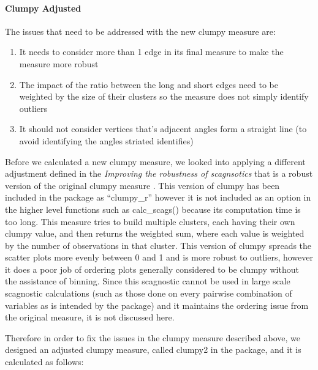 \hypertarget{clumpy-adjusted}{%
\paragraph{Clumpy Adjusted}\label{clumpy-adjusted}}

The issues that need to be addressed with the new clumpy measure are:

\begin{enumerate}
\def\labelenumi{\arabic{enumi}.}
\item
  It needs to consider more than 1 edge in its final measure to make the
  measure more robust
\item
  The impact of the ratio between the long and short edges need to be
  weighted by the size of their clusters so the measure does not simply
  identify outliers
\item
  It should not consider vertices that's adjacent angles form a straight
  line (to avoid identifying the angles striated identifies)
\end{enumerate}

Before we calculated a new clumpy measure, we looked into applying a
different adjustment defined in the \emph{Improving the robustness of
scagnsotics} that is a robust version of the original clumpy measure
\citep{robust}. This version of clumpy has been included in the package
as ``clumpy\_r'' however it is not included as an option in the higher
level functions such as calc\_scags() because its computation time is
too long. This measure tries to build multiple clusters, each having
their own clumpy value, and then returns the weighted sum, where each
value is weighted by the number of observations in that cluster. This
version of clumpy spreads the scatter plots more evenly between 0 and 1
and is more robust to outliers, however it does a poor job of ordering
plots generally considered to be clumpy without the assistance of
binning. Since this scagnostic cannot be used in large scale scagnostic
calculations (such as those done on every pairwise combination of
variables as is intended by the package) and it maintains the ordering
issue from the original measure, it is not discussed here.

Therefore in order to fix the issues in the clumpy measure described
above, we designed an adjusted clumpy measure, called clumpy2 in the
package, and it is calculated as follows:

